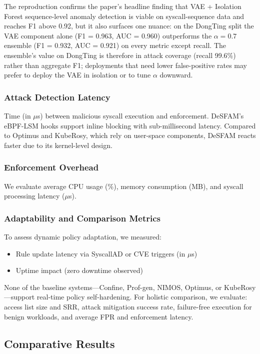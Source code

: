 The reproduction confirms the paper's headline finding that VAE +
Isolation Forest sequence-level anomaly detection is viable on
syscall-sequence data and reaches F1 above 0.92, but it also surfaces
one nuance: on the DongTing split the VAE component alone (F1 = 0.963,
AUC = 0.960) outperforms the $\alpha = 0.7$ ensemble (F1 = 0.932, AUC =
0.921) on every metric except recall. The ensemble's value on DongTing
is therefore in attack coverage (recall 99.6\%) rather than aggregate
F1; deployments that need lower false-positive rates may prefer to
deploy the VAE in isolation or to tune $\alpha$ downward.

\subsubsection{Attack Detection Latency}
Time (in $\mu$s) between malicious syscall execution and enforcement. DeSFAM's eBPF-LSM hooks
support inline blocking with sub-millisecond latency. Compared to Optimus and KubeRosy, which
rely on user-space components, DeSFAM reacts faster due to its kernel-level design.

\subsubsection{Enforcement Overhead}
We evaluate average CPU usage (\%), memory consumption (MB), and syscall processing latency
($\mu$s).

\subsubsection{Adaptability and Comparison Metrics}
To assess dynamic policy adaptation, we measured:
\begin{itemize}
  \item Rule update latency via SyscallAD or CVE triggers (in $\mu$s)
  \item Uptime impact (zero downtime observed)
\end{itemize}
None of the baseline systems---Confine, Prof-gen, NIMOS, Optimus, or KubeRosy---support
real-time policy self-hardening. For holistic comparison, we evaluate: access list size and
SRR, attack mitigation success rate, failure-free execution for benign workloads, and average
FPR and enforcement latency.

\subsection{Comparative Results}
\label{subsec:comparative_results}

